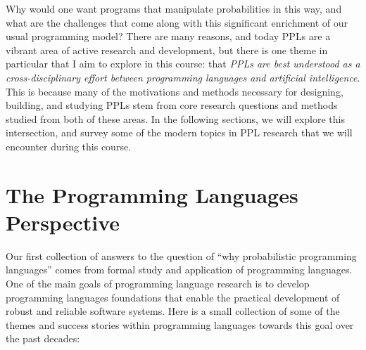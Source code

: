 \documentclass{../tufte-handout}
\begin{document}
Why would one want programs that manipulate probabilities in this way,
and what are the challenges that come along with this significant enrichment of
our usual programming model? 
There are many reasons, and today PPLs are a vibrant area of active research and 
development, but there is one theme in particular that I aim to explore in this course:
that \emph{PPLs are best understood as a cross-disciplinary 
effort between programming languages and artificial intelligence}.
This is because 
many of the motivations and methods necessary for designing, building, and studying PPLs stem from core 
research questions and methods studied from both of these areas.
In the following sections, we will explore 
this intersection, and survey some of the modern topics in PPL research that 
we will encounter during this course.

\section{The Programming Languages Perspective}


Our first collection of answers to the question of ``why probabilistic
programming languages'' comes from formal study and application of programming
languages. One of the main goals of programming language research is to develop
programming languages foundations that enable the practical development of
robust and reliable software systems. Here is a small collection of some 
of the themes and success stories within programming languages towards this goal over the past
decades:
\end{document}
